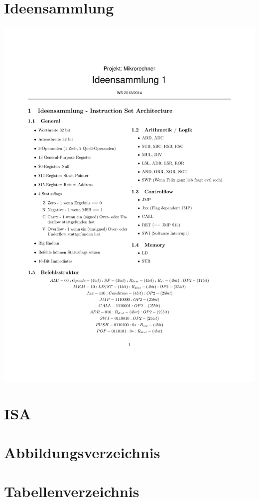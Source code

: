 \section{Ideensammlung}
\centering
\vspace*{-12em}
\includegraphics[width=\textwidth]{images/Ideensammlung.pdf}
\vspace*{-7em}
\section{ISA}


\section{Abbildungsverzeichnis}
\listoffigures 

\section{Tabellenverzeichnis}
\listoftables


